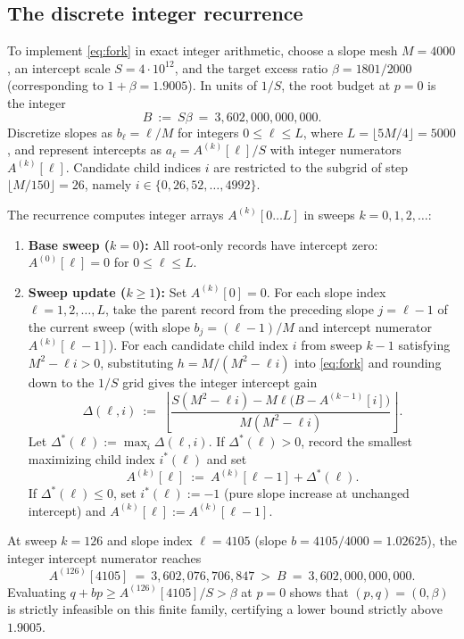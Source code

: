 \documentclass[11pt,letterpaper]{article}
\begin{document}
\subsection*{The discrete integer recurrence}

To implement \eqref{eq:fork} in exact integer arithmetic, choose a slope mesh $M=4000$, an intercept scale $S=4\cdot 10^{12}$, and the target excess ratio $\beta = 1801/2000$ (corresponding to $1+\beta = 1.9005$). In units of $1/S$, the root budget at $p=0$ is the integer
\[
  B\ :=\ S\beta\ =\ 3{,}602{,}000{,}000{,}000.
\]
Discretize slopes as $b_\ell = \ell/M$ for integers $0\le\ell\le L$, where $L=\lfloor 5M/4\rfloor = 5000$, and represent intercepts as $a_\ell = A^{(k)}[\ell]/S$ with integer numerators $A^{(k)}[\ell]$. Candidate child indices $i$ are restricted to the subgrid of step $\lfloor M/150\rfloor = 26$, namely $i\in\{0,26,52,\ldots,4992\}$.

The recurrence computes integer arrays $A^{(k)}[0\ldots L]$ in sweeps $k=0,1,2,\ldots$:
\begin{enumerate}
\item \textbf{Base sweep ($k=0$):} All root-only records have intercept zero: $A^{(0)}[\ell]=0$ for $0\le\ell\le L$.
\item \textbf{Sweep update ($k\ge 1$):} Set $A^{(k)}[0]=0$. For each slope index $\ell=1,2,\ldots,L$, take the parent record from the preceding slope $j=\ell-1$ of the current sweep (with slope $b_j=(\ell-1)/M$ and intercept numerator $A^{(k)}[\ell-1]$). For each candidate child index $i$ from sweep $k-1$ satisfying $M^2 - \ell i > 0$, substituting $h = M/(M^2-\ell i)$ into \eqref{eq:fork} and rounding down to the $1/S$ grid gives the integer intercept gain
\[
  \Delta(\ell,i)\ :=\ \left\lfloor
    \frac{S(M^2-\ell i) - M\ell\bigl(B - A^{(k-1)}[i]\bigr)}{M(M^2-\ell i)}
  \right\rfloor .
\]
Let $\Delta^*(\ell) := \max_i \Delta(\ell,i)$. If $\Delta^*(\ell) > 0$, record the smallest maximizing child index $i^*(\ell)$ and set
\[
  A^{(k)}[\ell]\ :=\ A^{(k)}[\ell-1] + \Delta^*(\ell).
\]
If $\Delta^*(\ell)\le 0$, set $i^*(\ell) := -1$ (pure slope increase at unchanged intercept) and $A^{(k)}[\ell] := A^{(k)}[\ell-1]$.
\end{enumerate}

At sweep $k=126$ and slope index $\ell=4105$ (slope $b = 4105/4000 = 1.02625$), the integer intercept numerator reaches
\[
  A^{(126)}[4105]\ =\ 3{,}602{,}076{,}706{,}847\ >\ B\ =\ 3{,}602{,}000{,}000{,}000.
\]
Evaluating $q + b p \ge A^{(126)}[4105]/S > \beta$ at $p=0$ shows that $(p,q)=(0,\beta)$ is strictly infeasible on this finite family, certifying a lower bound strictly above $1.9005$.
\end{document}
